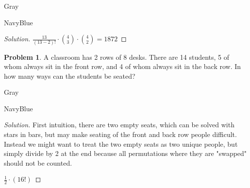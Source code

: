 \documentclass[12pt]{amsart}
\newcounter{problem_number}[section]
\theoremstyle{named}
\newenvironment{soln}
{\begin{color}{Gray}\begin{framed}\begin{color}{NavyBlue}\begin{proof}[Solution]
\doublespacing}
{\end{proof}\end{color}\end{framed}\end{color}}
\theoremstyle{definition}
\newtheorem{problem}{Problem}
\begin{document}
\begin{soln}
	\phantom{ }

    $\frac{13}{(13-2)!} \cdot {4 \choose 3} \cdot {4 \choose 2} = 1872$
\end{soln}

\phantom{ }

\phantom{ }

\phantom{ }

\phantom{ }

\phantom{ }

\begin{problem}
	A classroom has 2 rows of 8 desks. There are 14 students, 5 of whom always sit in the front row, and 4 of whom always sit in the back row. In how many ways can the students be seated?
\end{problem}

\begin{soln}
	\phantom{ }

	\noindent First intuition, there are two empty seats, which can be solved
	with stars in bars, but may make seating of the front and back row people
	difficult. Instead we might want to treat the two empty seats as two
	unique people, but simply divide by 2 at the end because all permutations
	where they are "swapped" should not be counted.   







	$\frac{1}{2} \cdot (16! )$
\end{soln}

\end{document}

